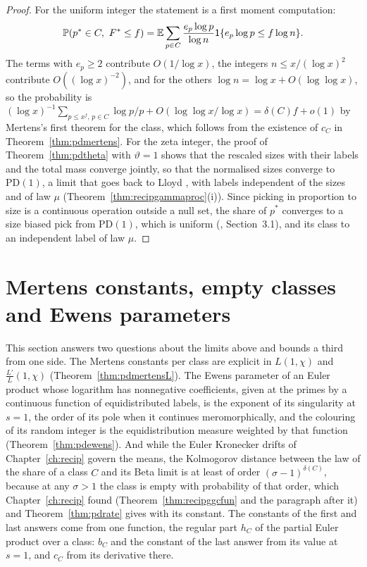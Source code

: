 \begin{proof}
For the uniform integer the statement is a first moment computation:
\[
\mathbb{P}(p^*\in C,\ F^*\le f)=\mathbb{E}\sum_{p\in C}\frac{e_p\log p}{\log n}\mathsf1\{e_p\log p\le f\log n\}.
\]
The terms with $e_p\ge2$ contribute $O(1/\log x)$, the integers $n\le x/(\log x)^2$ contribute $O((\log x)^{-2})$, and for the others $\log n=\log x+O(\log\log x)$, so the probability is $(\log x)^{-1}\sum_{p\le x^f,\,p\in C}\log p/p+O(\log\log x/\log x)=\delta(C)f+o(1)$ by Mertens's first theorem for the class, which follows from the existence of $c_C$ in Theorem~\ref{thm:pdmertens}. For the zeta integer, the proof of Theorem~\ref{thm:pdtheta} with $\vartheta=1$ shows that the rescaled sizes with their labels and the total mass converge jointly, so that the normalised sizes converge to $\mathrm{PD}(1)$, a limit that goes back to Lloyd \cite{lloyd1984}, with labels independent of the sizes and of law $\mu$ (Theorem~\ref{thm:recipgammaproc}(i)). Since picking in proportion to size is a continuous operation outside a null set, the share of $p^*$ converges to a size biased pick from $\mathrm{PD}(1)$, which is uniform (\cite{pitman2006}, Section~3.1), and its class to an independent label of law $\mu$.
\end{proof}

\section[Mertens constants, empty classes and Ewens parameters]{Mertens constants, empty classes\\ and Ewens parameters}\label{sec:pdprogress}

This section answers two questions about the limits above and bounds a third from one side. The Mertens constants per class are explicit in $L(1,\chi)$ and $\frac{L'}L(1,\chi)$ (Theorem~\ref{thm:pdmertensL}). The Ewens parameter of an Euler product whose logarithm has nonnegative coefficients, given at the primes by a continuous function of equidistributed labels, is the exponent of its singularity at $s=1$, the order of its pole when it continues meromorphically, and the colouring of its random integer is the equidistribution measure weighted by that function (Theorem~\ref{thm:pdewens}). And while the Euler Kronecker drifts of Chapter~\ref{ch:recip} govern the means, the Kolmogorov distance between the law of the share of a class $C$ and its Beta limit is at least of order $(\sigma-1)^{\delta(C)}$, because at any $\sigma>1$ the class is empty with probability of that order, which Chapter~\ref{ch:recip} found (Theorem~\ref{thm:recipggcfun} and the paragraph after it) and Theorem~\ref{thm:pdrate} gives with its constant. The constants of the first and last answers come from one function, the regular part $h_C$ of the partial Euler product over a class: $b_C$ and the constant of the last answer from its value at $s=1$, and $c_C$ from its derivative there.


